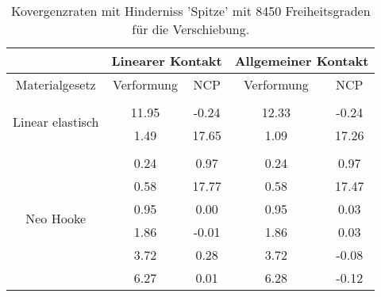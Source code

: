 \begin{table} 
\centering 
\begin{tabular}{c|cc|cc|} 
\cline{2-5} 
 & \multicolumn{2}{|c|}{Linearer Kontakt} & \multicolumn{2}{|c|}{Allgemeiner Kontakt} \\ 
\hline 
\multicolumn{1}{|c|}{Materialgesetz} & \multicolumn{1}{c|}{Verformung} & \multicolumn{1}{c|}{NCP} & \multicolumn{1}{c|}{Verformung} & \multicolumn{1}{c|}{NCP} \\ 
\hline 
\multicolumn{1}{|c|}{\multirow{3}{*}{Linear elastisch}} &\multicolumn{1}{|c|}{} & \multicolumn{1}{|c|}{} & \multicolumn{1}{|c|}{} & \multicolumn{1}{|c|}{} \\ 
\multicolumn{1}{|c|}{} & \multicolumn{1}{|c|}{     11.95} & \multicolumn{1}{|c|}{     -0.24} & \multicolumn{1}{|c|}{     12.33} & \multicolumn{1}{|c|}{     -0.24} \\ 
\multicolumn{1}{|c|}{} & \multicolumn{1}{|c|}{      1.49} & \multicolumn{1}{|c|}{     17.65} & \multicolumn{1}{|c|}{      1.09} & \multicolumn{1}{|c|}{     17.26} \\ 
\hline 
\multicolumn{1}{|c|}{\multirow{7}{*}{Neo Hooke}} &\multicolumn{1}{|c|}{} & \multicolumn{1}{|c|}{} & \multicolumn{1}{|c|}{} & \multicolumn{1}{|c|}{} \\ 
\multicolumn{1}{|c|}{} & \multicolumn{1}{|c|}{      0.24} & \multicolumn{1}{|c|}{      0.97} & \multicolumn{1}{|c|}{      0.24} & \multicolumn{1}{|c|}{      0.97} \\ 
\multicolumn{1}{|c|}{} & \multicolumn{1}{|c|}{      0.58} & \multicolumn{1}{|c|}{     17.77} & \multicolumn{1}{|c|}{      0.58} & \multicolumn{1}{|c|}{     17.47} \\ 
\multicolumn{1}{|c|}{} & \multicolumn{1}{|c|}{      0.95} & \multicolumn{1}{|c|}{      0.00} & \multicolumn{1}{|c|}{      0.95} & \multicolumn{1}{|c|}{      0.03} \\ 
\multicolumn{1}{|c|}{} & \multicolumn{1}{|c|}{      1.86} & \multicolumn{1}{|c|}{     -0.01} & \multicolumn{1}{|c|}{      1.86} & \multicolumn{1}{|c|}{      0.03} \\ 
\multicolumn{1}{|c|}{} & \multicolumn{1}{|c|}{      3.72} & \multicolumn{1}{|c|}{      0.28} & \multicolumn{1}{|c|}{      3.72} & \multicolumn{1}{|c|}{     -0.08} \\ 
\multicolumn{1}{|c|}{} & \multicolumn{1}{|c|}{      6.27} & \multicolumn{1}{|c|}{      0.01} & \multicolumn{1}{|c|}{      6.28} & \multicolumn{1}{|c|}{     -0.12} \\ 
\hline 
\end{tabular}\caption{Kovergenzraten mit Hinderniss 'Spitze' mit 8450 Freiheitsgraden für die Verschiebung.}\label{tab:Rate_Spitze_level5}
\end{table} 
